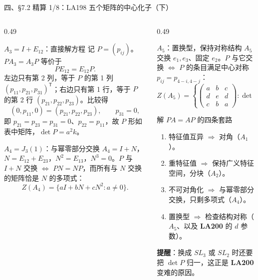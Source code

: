 \documentclass[aspectratio=169,10pt,fontset=none]{ctexbeamer}
\newcommand{\ex}[1]{\textcolor{accent}{\footnotesize\bfseries #1}}
\newcommand{\key}[1]{\textcolor{ink}{\bfseries #1}}
\begin{document}
\begin{frame}[t]{四、\S7.2 精算 1/8：LA198 五个矩阵的中心化子（下）}
  \begin{columns}[T,onlytextwidth]
    \begin{column}{0.49\textwidth}
      \begin{block}{\footnotesize $A_3=I+E_{12}$：直接解方程}
        \scriptsize
        记 $P=(p_{ij})$。$PA_3=A_3P$ 等价于
        \[ PE_{12}=E_{12}P. \]
        左边只有第 2 列，等于 $P$ 的第 1 列 $(p_{11},p_{21},p_{31})^{\mathsf T}$；右边只有第 1 行，等于 $P$ 的第 2 行 $(p_{21},p_{22},p_{23})$。比较得
        \[ (0,p_{11},0)=(p_{21},p_{22},p_{23}),\qquad p_{31}=0, \]
        即 $p_{21}=p_{23}=p_{31}=0$、$p_{22}=p_{11}$，故 $P$ 形如表中矩阵，$\det P=a^2k$。
      \end{block}
      \begin{block}{\footnotesize $A_4=J_3(1)$：与幂零部分交换}
        \scriptsize
        $A_4=I+N$，$N=E_{12}+E_{23}$，$N^2=E_{13}$，$N^3=0$。$P$ 与 $I+N$ 交换 $\iff$ $PN=NP$，而所有与 $N$ 交换的矩阵恰是 $N$ 的多项式：
        \[ Z(A_4)=\{aI+bN+cN^2:a\ne0\}. \]
      \end{block}
    \end{column}
    \begin{column}{0.49\textwidth}
      \begin{block}{\footnotesize $A_5$：置换型，保持对称结构}
        \scriptsize
        $A_5$ 交换 $e_1,e_3$、固定 $e_2$。$P$ 与它交换 $\iff$ $P$ 的条目满足中心对称 $p_{ij}=p_{4-i,4-j}$：
        \[ Z(A_5)=\left\{\begin{pmatrix}a&b&c\\d&e&d\\c&b&a\end{pmatrix}:\det\ne0\right\}. \]
      \end{block}
      \begin{block}{\footnotesize 解 $PA=AP$ 的四条套路}
        \scriptsize
        \begin{enumerate}\setlength{\itemsep}{1pt}
          \item 特征值互异 $\Rightarrow$ 对角（$A_1$）。
          \item 重特征值 $\Rightarrow$ 保持广义特征空间，分块（$A_2$）。
          \item 不可对角化 $\Rightarrow$ 与幂零部分交换，只剩多项式（$A_4$）。
          \item 置换型 $\Rightarrow$ 检查结构对称（$A_5$、以及 \ex{LA200} 的 $d$ 参数）。
        \end{enumerate}
        \key{提醒}：换成 $SL_3$ 或 $SL_2$ 时还要把 $\det P$ 归一，这正是 \ex{LA200} 变难的原因。
      \end{block}
    \end{column}
  \end{columns}
\end{frame}
\end{document}
